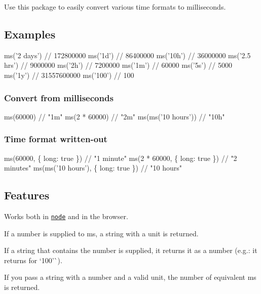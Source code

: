 \href{https://travis-ci.org/zeit/ms}{\tt } \href{https://zeit.chat/}{\tt }

Use this package to easily convert various time formats to milliseconds.

\subsection*{Examples}


\begin{DoxyCode}
ms('2 days')  // 172800000
ms('1d')      // 86400000
ms('10h')     // 36000000
ms('2.5 hrs') // 9000000
ms('2h')      // 7200000
ms('1m')      // 60000
ms('5s')      // 5000
ms('1y')      // 31557600000
ms('100')     // 100
\end{DoxyCode}


\subsubsection*{Convert from milliseconds}


\begin{DoxyCode}
ms(60000)             // "1m"
ms(2 * 60000)         // "2m"
ms(ms('10 hours'))    // "10h"
\end{DoxyCode}


\subsubsection*{Time format written-\/out}


\begin{DoxyCode}
ms(60000, \{ long: true \})             // "1 minute"
ms(2 * 60000, \{ long: true \})         // "2 minutes"
ms(ms('10 hours'), \{ long: true \})    // "10 hours"
\end{DoxyCode}


\subsection*{Features}


\begin{DoxyItemize}
\item Works both in \href{https://nodejs.org}{\tt node} and in the browser.
\item If a number is supplied to {\ttfamily ms}, a string with a unit is returned.
\item If a string that contains the number is supplied, it returns it as a number (e.\+g.\+: it returns {} for `\textquotesingle{}100'\`{}).
\item If you pass a string with a number and a valid unit, the number of equivalent ms is returned.
\end{DoxyItemize}

